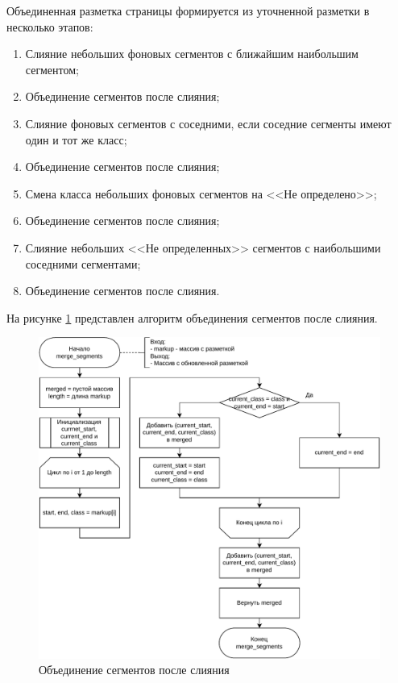 Объединенная разметка страницы формируется из уточненной разметки в несколько этапов:
\begin{enumerate}
    \item Слияние небольших фоновых сегментов с ближайшим наибольшим сегментом;
    \item Объединение сегментов после слияния;
    \item Слияние фоновых сегментов с соседними, если соседние сегменты имеют один и тот же класс;
    \item Объединение сегментов после слияния;
    \item Смена класса небольших фоновых сегментов на <<Не определено>>;
    \item Объединение сегментов после слияния;
    \item Слияние небольших <<Не определенных>> сегментов с наибольшими соседними сегментами;
    \item Объединение сегментов после слияния.
\end{enumerate}

На рисунке \ref{fig:merge-segments} представлен алгоритм объединения сегментов после слияния.

\begin{figure}[H]
	\centering
	\includegraphics[width=\textwidth]{diag/merge.segments.pdf}
	\caption{Объединение сегментов после слияния}
	\label{fig:merge-segments}
\end{figure}

